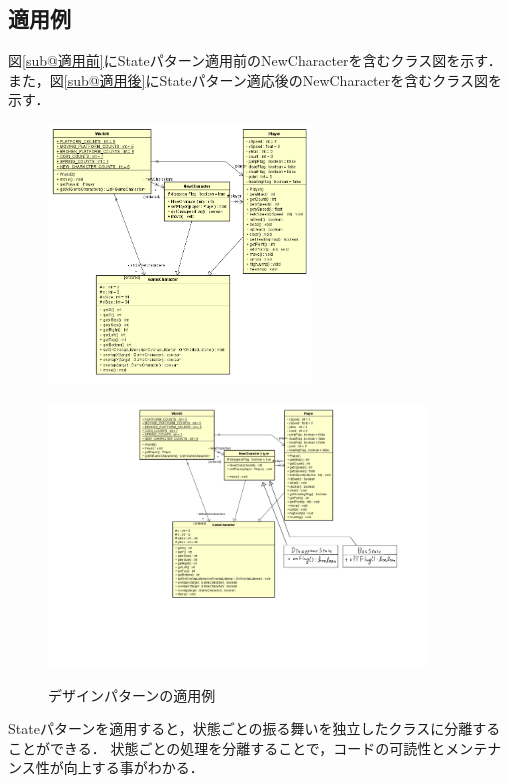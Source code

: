 \documentclass[titlepage,a4paper]{jsarticle}
\begin{document}
\subsection{適用例}
図\ref{sub@適用前}にStateパターン適用前のNewCharacterを含むクラス図を示す．
また，図\ref{sub@適用後}にStateパターン適応後のNewCharacterを含むクラス図を示す．
\begin{figure}[H]
  \centering
  \begin{minipage}[]{0.8\hsize}
    \centering
    \includegraphics[width=7cm]{img/class.png}
    \label{適用前}
  \end{minipage}

  \begin{minipage}[]{0.8\hsize}
    \centering
    \includegraphics[width=10cm]{img/Class_After.pdf}
    \label{適用後}
  \end{minipage}
  \caption{デザインパターンの適用例}
  \label{デザインパターン}
\end{figure}
Stateパターンを適用すると，状態ごとの振る舞いを独立したクラスに分離することができる．
状態ごとの処理を分離することで，コードの可読性とメンテナンス性が向上する事がわかる．
\end{document}
